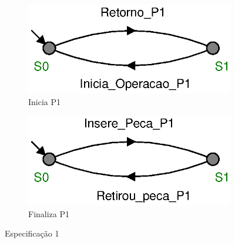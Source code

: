 \begin{figure}[H]%
  \centering
  \begin{subfigure}[b]{0.45\textwidth}
      \centering
      \includegraphics[width=\textwidth]{imagens/E1_inicia_P1.eps}
      \caption{Inicia P1}
      \label{fig:e1a}
  \end{subfigure}
  \hfill
  \begin{subfigure}[b]{0.45\textwidth}
      \centering
      \includegraphics[width=\textwidth]{imagens/E1_finaliza_P1.eps}
      \caption{Finaliza P1}
      \label{fig:e1b}
  \end{subfigure}
  \caption{Especificação 1}
  \label{fig:e1}
\end{figure}

